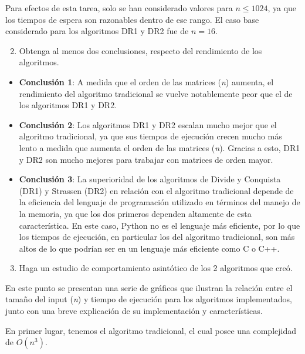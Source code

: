 \documentclass[12pt]{report}
\begin{document}
  Para efectos de esta tarea, solo se han considerado valores para $ n \leq 1024 $, ya que los tiempos de espera son razonables dentro de ese rango. El caso base considerado para los algoritmos DR1 y DR2 fue de $n = 16$.
  
  \begin{enumerate}
    \setcounter{enumi}{1}
    \item Obtenga al menos dos conclusiones, respecto del rendimiento de los algoritmos.
  \end{enumerate}
  
  \begin{itemize}
    \item \textbf{Conclusión 1}: A medida que el orden de las matrices (\textit{n}) aumenta, el rendimiento del algoritmo tradicional se vuelve notablemente peor que el de los algoritmos DR1 y DR2.
    \item \textbf{Conclusión 2}: Los algoritmos DR1 y DR2 escalan mucho mejor que el algoritmo tradicional, ya que sus tiempos de ejecución crecen mucho más lento a medida que aumenta el orden de las matrices (\textit{n}). Gracias a esto, DR1 y DR2 son mucho mejores para trabajar con matrices de orden mayor.
    \item \textbf{Conclusión 3}: La superioridad de los algoritmos de Divide y Conquista (DR1) y Strassen (DR2) en relación con el algoritmo tradicional depende de la eficiencia del lenguaje de programación utilizado en términos del manejo de la memoria, ya que los dos primeros dependen altamente de esta característica. En este caso, Python no es el lenguaje más eficiente, por lo que los tiempos de ejecución, en particular los del algoritmo tradicional, son más altos de lo que podrían ser en un lenguaje más eficiente como C o C++.
  \end{itemize}

  \newpage
  
  \begin{enumerate}
    \setcounter{enumi}{2}
    \item Haga un estudio de comportamiento asintótico de los 2 algoritmos que creó.
  \end{enumerate}
  
  En este punto se presentan una serie de gráficos que ilustran la relación entre el tamaño del input (\textit{n}) y tiempo de ejecución para los algoritmos implementados, junto con una breve explicación de su implementación y características.
  
  En primer lugar, tenemos el algoritmo tradicional, el cual posee una complejidad de $ O(n^3) $.
\end{document}
